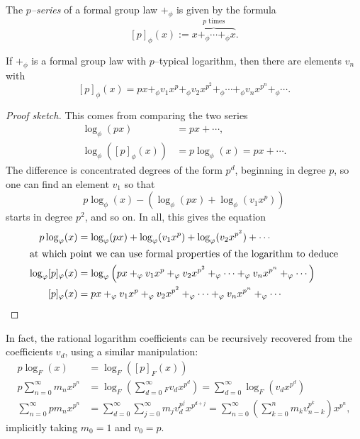 \begin{definition}
The \textit{$p$--series} of a formal group law $+_\phi$ is given by the formula \[[p]_\phi(x) := \overset{\text{$p$ times}}{\overbrace{x +_\phi \cdots +_\phi x}}.\]
\end{definition}

\begin{lemma}
If $+_\phi$ is a formal group law with $p$--typical logarithm, then there are elements $v_n$ with \[[p]_\phi(x) = px +_\phi v_1 x^p +_\phi v_2 x^{p^2} +_\phi \cdots +_\phi v_n x^{p^n} +_\phi \cdots.\]
\end{lemma}
\begin{proof}[Proof sketch]
This comes from comparing the two series
\begin{align*}
\log_\phi(px) & = px + \cdots, \\
\log_\phi([p]_\phi(x)) & = p \log_\phi(x) = px + \cdots.
\end{align*}
The difference is concentrated degrees of the form $p^d$, beginning in degree $p$, so one can find an element $v_1$ so that \[p \log_\phi(x) - (\log_\phi(px) + \log_\phi(v_1 x^p))\] starts in degree $p^2$, and so on.  In all, this gives the equation
\begin{align*}
p \log_\phi(x) & = \log_\phi (px) + \log_\phi(v_1 x^p) + \log_\phi(v_2 x^{p^2}) + \cdots \\
\intertext{at which point we can use formal properties of the logarithm to deduce}
\log_\phi [p]_\phi(x) & = \log_\phi \left(px +_\phi v_1 x^p +_\phi v_2 x^{p^2} +_\phi \cdots +_\phi v_n x^{p^n} +_\phi \cdots\right) \\
[p]_\phi(x) & = px +_\phi v_1 x^p +_\phi v_2 x^{p^2} +_\phi \cdots +_\phi v_n x^{p^n} +_\phi \cdots \qedhere
\end{align*}
\end{proof}

\begin{remark}
In fact, the rational logarithm coefficients can be recursively recovered from the coefficients $v_d$, using a similar manipulation:
\begin{align*}
p \log_F(x) & = \log_F\left([p]_F(x)\right) \\
p \sum_{n=0}^\infty m_n x^{p^n} & = \log_F \left(\sum_{d=0}^\infty{}_F v_d x^{p^d} \right) = \sum_{d=0}^\infty \log_F\left(v_d x^{p^d}\right) \\
\sum_{n=0}^\infty p m_n x^{p^n} & = \sum_{d=0}^\infty \sum_{j=0}^\infty m_j v_d^{p^j} x^{p^{d+j}} = \sum_{n=0}^\infty \left( \sum_{k=0}^n m_k v_{n-k}^{p^k} \right) x^{p^n},
\end{align*}
implicitly taking $m_0 = 1$ and $v_0 = p$.
\end{remark}

